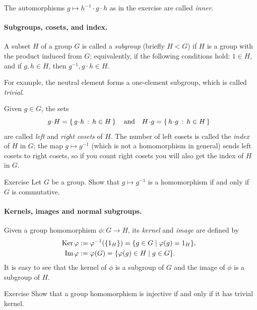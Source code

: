 The automorphisms $g\mapsto h^{-1}\cdot g\cdot h$ as in the exercise are called \emph{inner}.

\paragraph{Subgroups, cosets, and index.}
A subset $H$ of a group $G$ is called a
\emph{subgroup} (briefly $H<G$)
if $H$ is a group with the product induced from $G$;
equivalently, if the following conditions hold: $1\in H$, and if $g,h\in H$, then $g^{-1},g\cdot h\in H$.

For example, the neutral element forms a one-element subgroup, which is called \emph{trivial}.

Given $g\in G$, the sets
\[g\cdot H=\set{g\cdot h}{h\in H}\quad\text{and}\quad H\cdot g=\set{h\cdot g}{h\in H}\]
are called {}\emph{left} and \emph{right cosets} of $H$.
The number of left cosets is called the \emph{index} of $H$ in $G$;
the map $g\mapsto g^{-1}$ (which is not a homomorphism in general) sends left cosets to right cosets,
so if you count right cosets you will also get the index of $H$ in $G$.

\begin{thm}{Exercise}\label{ex:invG}
Let $G$ be a group. Show that $g\mapsto g^{-1}$ is a homomorphism if and only if $G$ is commutative.
\end{thm}

\paragraph{Kernels, images and normal subgroups.}
Given a group homomorphism $\phi\colon G\to H$, its
\emph{kernel} and
\emph{image} are defined by
\begin{align*}
\mathop{\rm Ker}\varphi&\mathrel{:=} \varphi^{-1}(\{1_H\})=\{g\in G\mid \varphi(g)=1_H\},
\\
\mathop{\rm Im}\varphi&\mathrel{:=} \varphi(G)= \{\varphi(g)\in H\mid g\in G\}.
\end{align*}
It is easy to see that the kernel of $\phi$ is a subgroup of $G$ and the image of $\phi$ is a subgroup of $H$.

\begin{thm}{Exercise}\label{ex:inj-homo}
Show that a group homomorphism is injective if and only if it has trivial kernel.
\end{thm}



